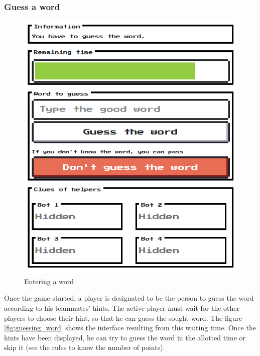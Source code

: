 \documentclass{tnreport}
\begin{document}
\bigskip

\subsubsection{Guess a word}

\begin{figure}
	\centering
	\vspace*{-1cm}
	\includegraphics[scale=0.4]{figures/guessing_word}
	\vspace*{-0.1cm}
	\caption{Entering a word}
	\label{fig:entering_word}
\end{figure}

Once the game started, a player is designated to be the person to guess the word according to his teammates' hints. The active player must wait for the other players to choose their hint, so that he can guess the sought word. The figure \ref{fig:guessing_word} shows the interface resulting from this waiting time. Once the hints have been displayed, he can try to guess the word in the allotted time or skip it (see the rules to know the number of points). 
\end{document}

